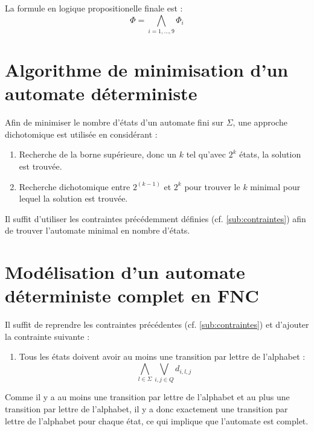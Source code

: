 \documentclass[a4paper, 12pt]{extarticle}
\begin{document}
La formule en logique propositionelle finale est :
\begin{equation*}
    \Phi=\bigwedge_{i=1,\dots,9} \Phi_i
\end{equation*}

\section{Algorithme de minimisation d'un automate déterministe}
\label{sec:algo_minimisation}
\noindent Afin de minimiser le nombre d'états d'un automate fini sur $\Sigma$, une approche dichotomique est utilisée en considérant :
\begin{enumerate}
    \item Recherche de la borne supérieure, donc un $k$ tel qu'avec $2^k$ états, la solution est trouvée.
    \item Recherche dichotomique entre $2^{(k-1)}$ et $2^k$ pour trouver le $k$ minimal pour lequel la solution est trouvée.
\end{enumerate}
Il suffit d'utiliser les contraintes précédemment définies (cf. \ref{sub:contraintes}) afin de trouver
l'automate minimal en nombre d'états.

\section{Modélisation d'un automate déterministe complet en FNC} 
\label{sec:automate_deterministe_complet}
\noindent Il suffit de reprendre les contraintes précédentes (cf. \ref{sub:contraintes}) et d'ajouter la
contrainte suivante :
\begin{enumerate}
    \item Tous les états doivent avoir au moins une transition par lettre de l'alphabet :
    \begin{equation*}
        \bigwedge_{l \in \Sigma} \bigvee_{i,j\in Q} d_{i,l,j}
    \end{equation*}
\end{enumerate}
Comme il y a au moins une transition par lettre de l'alphabet et au plus une transition par lettre de l'alphabet,
il y a donc exactement une transition par lettre de l'alphabet pour chaque état, ce qui implique que l'automate est complet.
\end{document}
